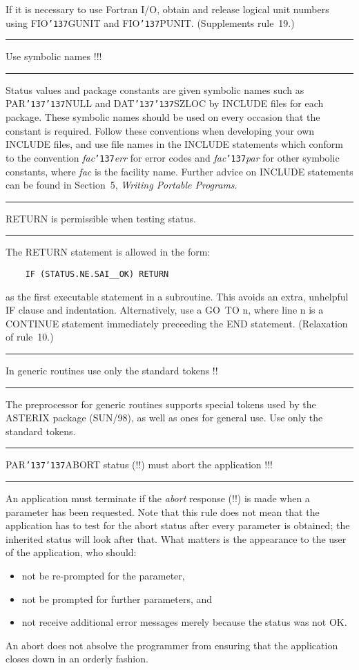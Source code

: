\documentclass[twoside,11pt]{article}
\newcounter{sruleno}
\newcommand{\srule}[1]{
    \addtocounter{sruleno}{1}
    \goodbreak
    \rule[0.5ex]{\textwidth}{0.3mm}
    {\Large #1 \hfill {\thesruleno}}
    \rule[0.5ex]{\textwidth}{0.1mm}
}
\newcommand{\srule}[1]{
       \addtocounter{sruleno}{1}
       \begin{rawhtml} <HR> \end{rawhtml}
       {\Large \thesruleno}~~~~{\Large #1}
       \begin{rawhtml} <HR> \end{rawhtml}
       \end{tabular}
  }
\renewcommand{\_}{{\tt\char'137}}
\begin{document}
If it is necessary to use Fortran I/O, obtain and release logical unit numbers
using FIO\_GUNIT and FIO\_PUNIT.
(Supplements rule~19.)

\srule{Use symbolic names !!!}
Status values and package constants are given symbolic names such as
PAR\_\_NULL and DAT\_\_SZLOC by INCLUDE files for each package.
These symbolic names should be used on every occasion that the constant is
required.  Follow these conventions when developing your own
INCLUDE files, and use file names in the INCLUDE statements
which conform to the convention {\it fac}\_{\it err} for
error codes and {\it fac}\_{\it par} for other symbolic
constants, where {\it fac} is the facility name.  Further
advice on INCLUDE statements can be found in Section~5, {\it Writing
Portable Programs}.

\srule{RETURN is permissible when testing status.}
The RETURN statement is allowed in the form:
\begin{verbatim}
    IF (STATUS.NE.SAI__OK) RETURN
\end{verbatim}
as the first executable statement in a subroutine.
This avoids an extra, unhelpful IF clause and indentation.
Alternatively, use a GO~TO n, where line n is a CONTINUE statement immediately
preceeding the END statement.
(Relaxation of rule~10.)

\srule{In generic routines use only the standard tokens !!}
The preprocessor for
generic routines supports special tokens used by the \mbox{ASTERIX}
package (SUN/98), as well
as ones for general use.  Use only the standard tokens.

\srule{PAR\_\_ABORT status (!!) must abort the application !!!}
An application must terminate if the {\it abort} response (!!) is
made when a parameter has been requested.  Note that this rule
does not mean that the application has to test for the abort
status after every parameter is obtained;  the inherited
status will look after that.  What matters is the appearance to the
user of the application, who should:
\begin{itemize}
\item not be re-prompted for the parameter,
\item not be prompted for further parameters, and
\item not receive additional error messages merely because
the status was not OK.
\end{itemize}
An abort does not absolve the programmer from ensuring that the
application closes down in an orderly fashion.
\end{document}
